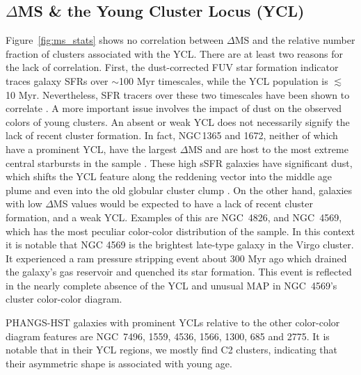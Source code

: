 \documentclass[linenumbers]{aastex63}
\begin{document}




\subsection{$\Delta$MS \& the Young Cluster Locus (YCL)}\label{sec:ycl}
Figure~\ref{fig:ms_stats} shows no correlation between $\Delta$MS and the relative number fraction of clusters associated with the YCL. There are at least two reasons for the lack of correlation.  First, the dust-corrected FUV star formation indicator traces galaxy SFRs over $\sim$100 Myr timescales, while the YCL population is $\lesssim$ 10 Myr.  Nevertheless, SFR tracers over these two timescales have been shown to correlate \citep[e.g.,][and references therein]{salim_uv_2007, lee_comparison_2009}.  A more important issue involves the impact of dust on the observed colors of young clusters.   An absent or weak YCL does not necessarily signify the lack of recent cluster formation.  In fact, NGC\,1365 and 1672, neither of which have a prominent YCL, have the largest $\Delta$MS and are host to the most extreme central starbursts in the sample \citep{brandt_rosat_1996, querejeta_stellar_2021, whitmore_phangs-jwst_2023}.  These high sSFR galaxies have significant dust, which shifts the YCL feature along the reddening vector into the middle age plume \citep{thilker23sed} and even into the old globular cluster clump \citep{hollyhead_studying_2015}. On the other hand, galaxies with low $\Delta$MS values would be expected to have a lack of recent cluster formation, and a weak YCL.  Examples of this are NGC~4826, and NGC~4569, which has the most peculiar color-color distribution of the sample.  In this context it is notable that NGC 4569 is the brightest late-type galaxy in the Virgo cluster.  It experienced a ram pressure stripping event about 300 Myr ago \citep{vollmer_ngc_2004,crowl_stellar_2008,boselli_spectacular_2016} which drained the galaxy's gas reservoir and quenched its star formation.  This event is reflected in the nearly complete absence of the YCL and unusual MAP in NGC~4569's cluster color-color diagram.

PHANGS-HST galaxies with prominent YCLs relative to the other color-color diagram features are
NGC~7496, 1559, 4536, 1566, 1300, 685 and 2775. %
It is notable that in their YCL regions, we mostly find C2 clusters, indicating that their asymmetric shape is associated with young age.   %
\end{document}
